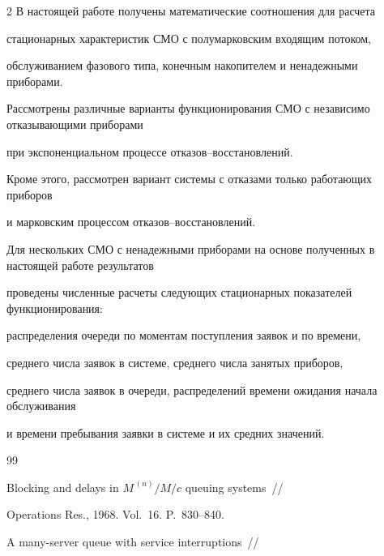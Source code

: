 \begin{multicols}{2}
В настоящей работе получены математические соотношения для расчета


стационарных характеристик СМО с полумарковским входящим потоком,


обслуживанием фазового типа, конечным накопителем и ненадежными приборами.


Рассмотрены различные варианты функционирования СМО с независимо отказывающими приборами


при экспоненциальном процессе отказов--восстановлений.


Кроме этого, рассмотрен вариант системы с отказами только работающих приборов


и марковским процессом отказов--восстановлений.


Для нескольких СМО с ненадежными приборами на основе полученных в настоящей работе результатов


проведены численные расчеты следующих стационарных показателей функционирования:


распределения очереди по моментам поступления заявок и по времени,


среднего числа заявок в системе, среднего числа занятых приборов,


среднего числа заявок в очереди, распределений времени ожидания начала обслуживания


и времени пребывания заявки в системе и их средних значений.





{\small\frenchspacing


{%




\begin{thebibliography}{99}









Blocking and delays in $M^{\,(n)}/M/c$ queuing systems~//


Operations Res., 1968. Vol.~16. P.~830--840.









A many-server queue with service interruptions~//



\end{thebibliography}}}
\end{multicols}
